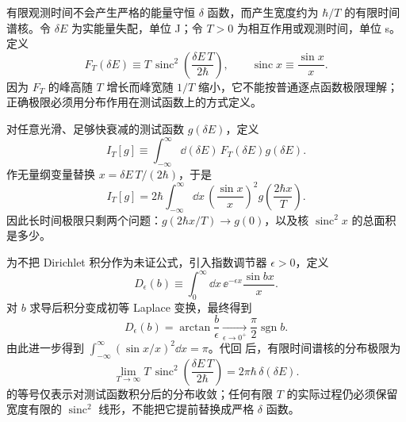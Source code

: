 
有限观测时间不会产生严格的能量守恒 $\delta$ 函数，而产生宽度约为 $\hbar/T$ 的有限时间谱核。令 $\delta E$ 为实能量失配，单位 J；令 $T>0$ 为相互作用或观测时间，单位 s。定义
\begin{equation*}
 F_T(\delta E)
 \equiv T\,\operatorname{sinc}^2\!\left(\frac{\delta E\,T}{2\hbar}\right),
 \qquad
 \operatorname{sinc}x\equiv\frac{\sin x}{x}.
\end{equation*}
因为 $F_T$ 的峰高随 $T$ 增长而峰宽随 $1/T$ 缩小，它不能按普通逐点函数极限理解；正确极限必须用分布作用在测试函数上的方式定义。

对任意光滑、足够快衰减的测试函数 $g(\delta E)$，定义
\begin{equation*}
 I_T[g]\equiv
 \int_{-\infty}^{\infty}\dd(\delta E)\,
 F_T(\delta E)g(\delta E).
\end{equation*}
作无量纲变量替换
$x=\delta E\,T/(2\hbar)$，于是
\begin{equation}
 {
 I_T[g]
 =2\hbar\int_{-\infty}^{\infty}\dd x\,
 \left(\frac{\sin x}{x}\right)^2
 g\!\left(\frac{2\hbar x}{T}\right).}
 \label{eq:sinc-test-substitution-r15}
\end{equation}
因此长时间极限只剩两个问题：$g(2\hbar x/T)\to g(0)$，以及核 $\operatorname{sinc}^2x$ 的总面积是多少。

为不把 Dirichlet 积分作为未证公式，引入指数调节器 $\epsilon>0$，定义
\begin{equation*}
 D_\epsilon(b)
 \equiv\int_0^\infty\dd x\,\ee^{-\epsilon x}\frac{\sin bx}{x}.
\end{equation*}
对 $b$ 求导后积分变成初等 Laplace 变换，最终得到
\begin{equation}
 {
 D_\epsilon(b)=\arctan\frac{b}{\epsilon}
 \xrightarrow[\epsilon\to0^+]{}
 \frac{\pi}{2}\operatorname{sgn}b.}
 \label{eq:dirichlet-integral-derived-r15}
\end{equation}
由此进一步得到
$\int_{-\infty}^{\infty}(\sin x/x)^2\dd x=\pi$。代回 后，有限时间谱核的分布极限为
\begin{equation}
 {
 \lim_{T\to\infty}
 T\,\operatorname{sinc}^2\!\left(\frac{\delta E\,T}{2\hbar}\right)
 =2\pi\hbar\,\delta(\delta E).}
 \label{eq:sinc-delta-proved-r15}
\end{equation}
 的等号仅表示对测试函数积分后的分布收敛；任何有限 $T$ 的实际过程仍必须保留宽度有限的 $\operatorname{sinc}^2$ 线形，不能把它提前替换成严格 $\delta$ 函数。
